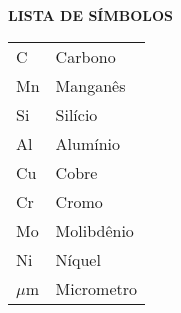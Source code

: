 \centering \textbf{\large{LISTA DE SÍMBOLOS} }

\vspace{2 cm}
\justifying
\begin{tabular}{l l}
    C &  Carbono\\[10pt]
    Mn & Manganês \\[10pt]
    Si & Silício \\[10pt]
    Al & Alumínio\\[10pt]
    Cu & Cobre\\[10pt]
    Cr & Cromo\\[10pt]
    Mo & Molibdênio\\[10pt]
    Ni & Níquel\\[10pt]
    $\mu$m & Micrometro\\[10pt]
\end{tabular}
